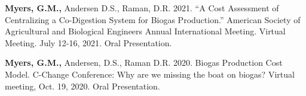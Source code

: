 \begin{cvparagraph}
  \textbf{Myers, G.M., }Andersen D.S., Raman, D.R. 2021. “A Cost Assessment of Centralizing a Co-Digestion System for Biogas Production.” American Society of Agricultural and Biological Engineers Annual International Meeting. Virtual Meeting. July 12-16, 2021. Oral Presentation.

  \textbf{Myers, G.M., }Andersen, D.S., Raman D.R. 2020. Biogas Production Cost Model. C-Change Conference: Why are we missing the boat on biogas? Virtual meeting, Oct. 19, 2020. Oral Presentation.

  


\end{cvparagraph}